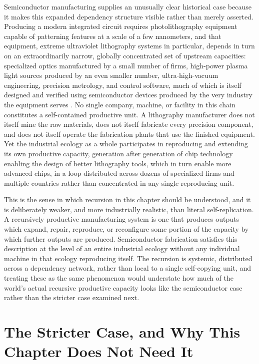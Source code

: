 \documentclass[11pt]{book}
\begin{document}
Semiconductor manufacturing supplies an unusually clear historical case because it makes this expanded dependency structure visible rather than merely asserted. Producing a modern integrated circuit requires photolithography equipment capable of patterning features at a scale of a few nanometers, and that equipment, extreme ultraviolet lithography systems in particular, depends in turn on an extraordinarily narrow, globally concentrated set of upstream capacities: specialized optics manufactured by a small number of firms, high-power plasma light sources produced by an even smaller number, ultra-high-vacuum engineering, precision metrology, and control software, much of which is itself designed and verified using semiconductor devices produced by the very industry the equipment serves \cite{miller2022}. No single company, machine, or facility in this chain constitutes a self-contained productive unit. A lithography manufacturer does not itself mine the raw materials, does not itself fabricate every precision component, and does not itself operate the fabrication plants that use the finished equipment. Yet the industrial ecology as a whole participates in reproducing and extending its own productive capacity, generation after generation of chip technology enabling the design of better lithography tools, which in turn enable more advanced chips, in a loop distributed across dozens of specialized firms and multiple countries rather than concentrated in any single reproducing unit.

This is the sense in which recursion in this chapter should be understood, and it is deliberately weaker, and more industrially realistic, than literal self-replication. A recursively productive manufacturing system is one that produces outputs which expand, repair, reproduce, or reconfigure some portion of the capacity by which further outputs are produced. Semiconductor fabrication satisfies this description at the level of an entire industrial ecology without any individual machine in that ecology reproducing itself. The recursion is systemic, distributed across a dependency network, rather than local to a single self-copying unit, and treating these as the same phenomenon would understate how much of the world's actual recursive productive capacity looks like the semiconductor case rather than the stricter case examined next.

\section{The Stricter Case, and Why This Chapter Does Not Need It}
\end{document}
